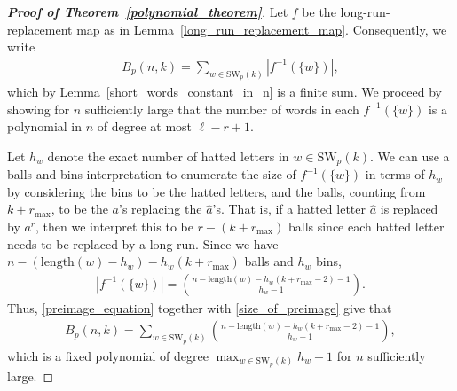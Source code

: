 \documentclass[11pt]{amsart}
\newcommand{\hatted}[1]{\widehat{#1}}
\begin{document}
\begin{proof}[\textbf{Proof of Theorem~\ref{polynomial_theorem}}]
    Let $f$ be the long-run-replacement map as in Lemma~\ref{long_run_replacement_map}. Consequently, we write
    \begin{align}\label{preimage_equation}
        B_p(n,k)=\sum_{w\in\text{SW}_p(k)}\left|f^{-1}(\{w\})\right|,
    \end{align}
    which by Lemma~\ref{short_words_constant_in_n} is a finite sum. We proceed by showing for $n$ sufficiently large that the number of words in each $f^{-1}(\{w\})$ is a polynomial in $n$ of degree at most $\ell-r+1$.



    Let $h_w$ denote the exact number of hatted letters in $w\in\text{SW}_p(k)$. We can use a balls-and-bins interpretation to enumerate the size of $f^{-1}(\{w\})$ in terms of $h_w$ by considering the bins to be the hatted letters, and the balls, counting from $k+r_{\max}$, to be the $a$'s replacing the $\hatted{a}$'s. That is, if a hatted letter $\hatted{a}$ is replaced by $a^r$, then we interpret this to be $r-(k+r_{\max})$ balls since each hatted letter needs to be replaced by a long run. Since we have $n-(\text{length}(w)-h_w)-h_w(k+r_{\max})$ balls and $h_w$ bins,
    \begin{align}\label{size_of_preimage}
        \left|f^{-1}(\{w\})\right|={n-\text{length}(w)-h_w(k+r_{\max}-2)-1\choose h_w-1}.
    \end{align}
     Thus, \eqref{preimage_equation} together with \eqref{size_of_preimage} give that
    \begin{align*}
         B_p(n,k)=\sum_{w\in\text{SW}_p(k)} {n-\text{length}(w)-h_w(k+r_{\max}-2)-1\choose h_w-1},
    \end{align*}
    which is a fixed polynomial of degree $\max_{w\in\text{SW}_p(k)}h_w-1$ for $n$ sufficiently large.
    
    

\end{proof}
\end{document}
